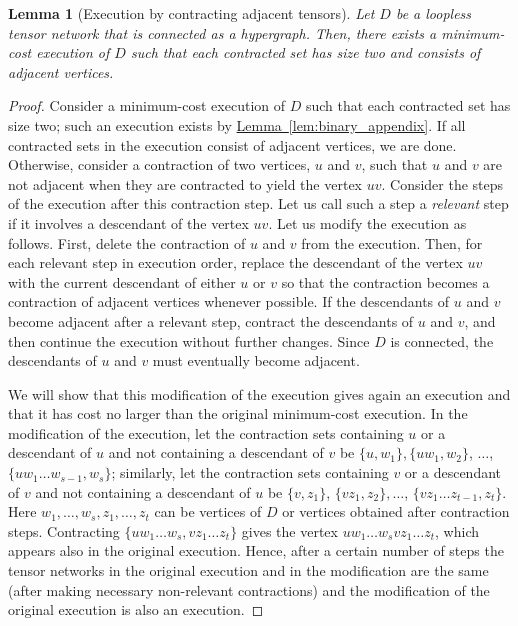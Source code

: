 \documentclass[11pt]{article}
\numberwithin{equation}{section}
\newtheorem{lemma}[theorem]{Lemma}
\theoremstyle{definition}
\theoremstyle{plain}
\newcommand{\expref}[2]{\hyperref[#2]{#1~\ref{#2}}}
\begin{document}
\begin{lemma}[Execution by contracting adjacent tensors]
\label{lem:adjacent}
Let $D$ be a loopless tensor network that is connected as a hypergraph.
Then, there exists a minimum-cost execution of $D$ such that
each contracted set has size two and consists of adjacent vertices.
\end{lemma}
\begin{proof}
Consider a minimum-cost execution of $D$ such that each contracted
set has size two; such an execution exists by \expref{Lemma}{lem:binary_appendix}.
If all contracted sets in the execution consist of adjacent vertices,
we are done. Otherwise, consider a contraction of two vertices, $u$ and $v$,
such that $u$ and $v$ are not adjacent when they are
contracted to yield the vertex $uv$.
Consider the steps of the execution after this contraction step.
Let us call such a step a \emph{relevant} step
if it involves a descendant of the vertex $uv$. Let us modify the
execution as follows. First, delete the contraction of $u$ and $v$ from
the execution. Then, for each relevant step in execution order, replace
the descendant of the vertex $uv$ with the current descendant of
either $u$ or $v$ so that the contraction becomes a contraction of
adjacent vertices whenever possible. If the descendants of $u$ and $v$
become adjacent after a relevant step, contract the descendants
of $u$ and $v$, and then continue the execution without further changes.
Since $D$ is connected, the descendants of $u$ and $v$
must eventually become adjacent.

We will show that this modification of the execution gives again an execution and that it has cost no larger than the original minimum-cost
execution.
In the modification of the execution, let the contraction sets containing $u$ or a descendant of $u$ and not containing a descendant of $v$ be $\{u,w_1\},\{uw_1,w_2\}$, $\ldots$, $\{uw_1\ldots w_{s-1},w_s\}$; similarly, let the contraction sets containing $v$ or a descendant of $v$ and not containing a descendant of $u$ be $\{v,z_1\}$, $\{vz_1,z_2\},\ldots$, $\{vz_1\ldots z_{t-1},z_t\}$. Here $w_1,\ldots,w_s,z_1,\ldots,z_t$ can be vertices of $D$ or vertices obtained after contraction steps.  Contracting $\{uw_1\ldots w_s,vz_1 \ldots z_t\}$  gives the vertex $uw_1 \ldots w_s v z_1 \ldots z_t$, which  appears also in the original execution. Hence, after a certain number of steps the tensor networks in the original execution and in the modification are the same (after making necessary non-relevant contractions) and the modification of the original execution is also an execution.


\end{proof}
\end{document}
